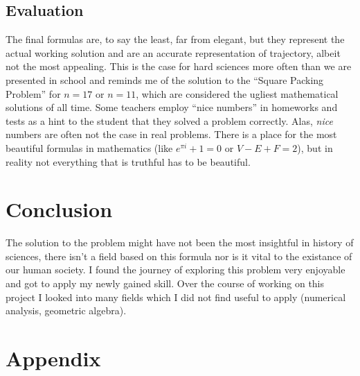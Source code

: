 \documentclass[12pt]{article}
\begin{document}
\subsection{Evaluation}
The final formulas are, to say the least, far from elegant, but they represent the actual working solution and are an accurate representation of trajectory, albeit not the most appealing. This is the case for hard sciences more often than we are presented in school and reminds me of the solution to the ``Square Packing Problem''\citep{squarepack} for $n = 17$\citep{bidwell} or $n = 11$\cite{trump}, which are considered the ugliest mathematical solutions of all time. Some teachers employ ``nice numbers''\citep{nicenumbers} in homeworks and tests as a hint to the student that they solved a problem correctly. Alas, \textit{nice} numbers are often not the case in real problems. There is a place for the most beautiful formulas in mathematics (like $e^{\pi i} + 1 = 0$ or $V - E + F = 2$), but in reality not everything that is truthful has to be beautiful.

\section{Conclusion}

The solution to the problem might have not been the most insightful in history of sciences, there isn't a field based on this formula nor is it vital to the existance of our human society. I found the journey of exploring this problem very enjoyable and got to apply my newly gained skill. Over the course of working on this project I  looked into many fields which I did not find useful to apply (numerical analysis, geometric algebra).

\section*{Appendix}
\end{document}
